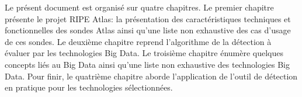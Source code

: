 Le présent document est organisé sur quatre chapitres. Le premier chapitre présente le projet RIPE Atlas: la présentation des caractéristiques techniques et fonctionnelles des sondes Atlas ainsi qu'une liste non exhaustive des cas d'usage de ces sondes. Le deuxième chapitre reprend l'algorithme de la détection à évaluer par les technologies Big Data.
Le troisième chapitre énumère quelques concepts liés au Big Data ainsi qu'une liste non exhaustive des technologies Big Data. Pour finir, le quatrième chapitre aborde l'application de l'outil de détection en pratique pour les technologies sélectionnées.


